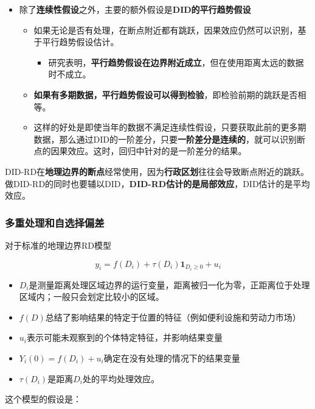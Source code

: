 \documentclass[11pt,a4paper]{ctexart}
\begin{document}
\begin{itemize}
\item
  除了\textbf{连续性假设}之外，主要的额外假设是\textbf{DID的平行趋势假设}

  \begin{itemize}
  \item
    如果无论是否有处理，在断点附近都有跳跃，因果效应仍然可以识别，基于平行趋势假设估计。

    \begin{itemize}
    \item
      研究表明，\textbf{平行趋势假设在边界附近成立}，但在使用距离太远的数据时不成立。
    \end{itemize}
  \item
    \textbf{如果有多期数据，平行趋势假设可以得到检验}，即检验前期的跳跃是否相等。
  \item
    这样的好处是即使当年的数据不满足连续性假设，只要获取此前的更多期数据，那么通过DID的一阶差分，只要\textbf{一阶差分是连续的}，就可以识别断点的因果效应。这时，回归中针对的是一阶差分的结果。
  \end{itemize}
\end{itemize}

DID-RD在\textbf{地理边界的断点}经常使用，因为\textbf{行政区划}往往会导致断点附近的跳跃。做DID-RD的同时也要辅以DID，\textbf{DID-RD估计的是局部效应}，DID估计的是平均效应。

\subsubsection{多重处理和自选择偏差}

对于标准的地理边界RD模型

\[y_i=f(D_i)+\tau (D_i)\boldsymbol1_{D_i\ge 0}+u_i\]

\begin{itemize}
\item
  \(D_i\)是测量距离处理区域边界的运行变量，距离被归一化为零，正距离位于处理区域内；一般只会划定比较小的区域。
\item
  \(f(D)\)总结了影响结果的特定于位置的特征（例如便利设施和劳动力市场）
\item
  \(u_i\)表示可能未观察到的个体特定特征，并影响结果变量
\item
  \(Y_i(0)=f(D_i)+u_i\)确定在没有处理的情况下的结果变量
\item
  \(\tau(D_i)\)是距离\(D_i\)处的平均处理效应。
\end{itemize}

这个模型的假设是：
\end{document}
